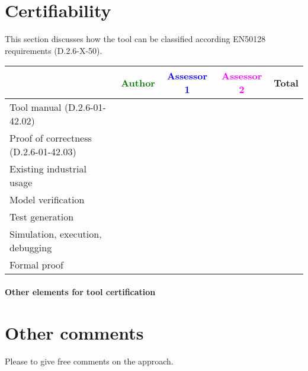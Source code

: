 \section{Certifiability}

This section discusses how the tool can be classified according EN50128 requirements (D.2.6-X-50).


\begin{tabular}{|l | c | c | c | c|}
\hline
& \textcolor{green}{Author} & \textcolor{blue}{Assessor 1} & \textcolor{magenta}{Assessor 2} & Total \\
\hline 
Tool manual (D.2.6-01-42.02) & & & &  \\
\hline
Proof of correctness (D.2.6-01-42.03)   & & & & \\
\hline
Existing industrial  usage  & & & & \\
\hline
Model verification & & & & \\
\hline
Test generation & & & & \\
\hline
Simulation, execution, debugging & & & & \\
\hline
Formal proof & & & & \\
\hline
\end{tabular}

\paragraph{Other elements for tool certification}

\section{Other comments}
Please to  give free comments on the approach.



